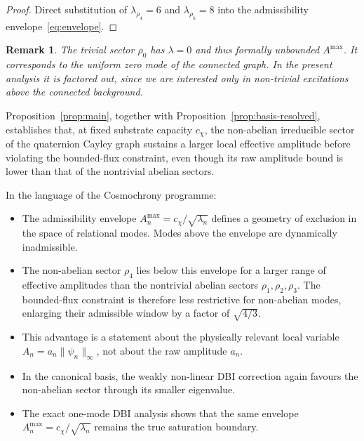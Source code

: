 \documentclass[11pt,a4paper]{article}
\newtheorem{remark}{Remark}
\begin{document}
  \begin{proof}
    Direct substitution of $\lambda_{\rho_4} = 6$ and $\lambda_{\rho_k} = 8$
    into the admissibility envelope~\eqref{eq:envelope}.
  \end{proof}

  \begin{remark}
    The trivial sector $\rho_0$ has $\lambda = 0$ and thus formally unbounded $A^{\max}$.
    It corresponds to the uniform zero mode of the connected graph.
    In the present analysis it is factored out, since we are interested only in
    non-trivial excitations above the connected background.
  \end{remark}

  Proposition~\ref{prop:main}, together with
  Proposition~\ref{prop:basis-resolved}, establishes that, at fixed substrate capacity
  $c_\chi$, the non-abelian irreducible sector of the quaternion Cayley graph sustains
  a larger local effective amplitude before violating the bounded-flux constraint,
  even though its raw amplitude bound is lower than that of the nontrivial abelian
  sectors.

  In the language of the Cosmochrony programme:
  \begin{itemize}
    \item The admissibility envelope $A_n^{\max} = c_\chi / \sqrt{\lambda_n}$ defines a
    geometry of exclusion in the space of relational modes.
    Modes above the envelope are dynamically inadmissible.
    \item The non-abelian sector $\rho_4$ lies below this envelope for a larger
    range of effective amplitudes than the nontrivial abelian sectors
    $\rho_1, \rho_2, \rho_3$.
    The bounded-flux constraint is therefore less restrictive for non-abelian modes,
    enlarging their admissible window by a factor of $\sqrt{4/3}$.
    \item This advantage is a statement about the physically relevant local variable
    $A_n = a_n \|\psi_n\|_\infty$, not about the raw amplitude $a_n$.
    \item In the canonical basis, the weakly non-linear DBI correction again favours
    the non-abelian sector through its smaller eigenvalue.
    \item The exact one-mode DBI analysis shows that the same envelope
    $A_n^{\max} = c_\chi/\sqrt{\lambda_n}$ remains the true saturation boundary.
  \end{itemize}
\end{document}
